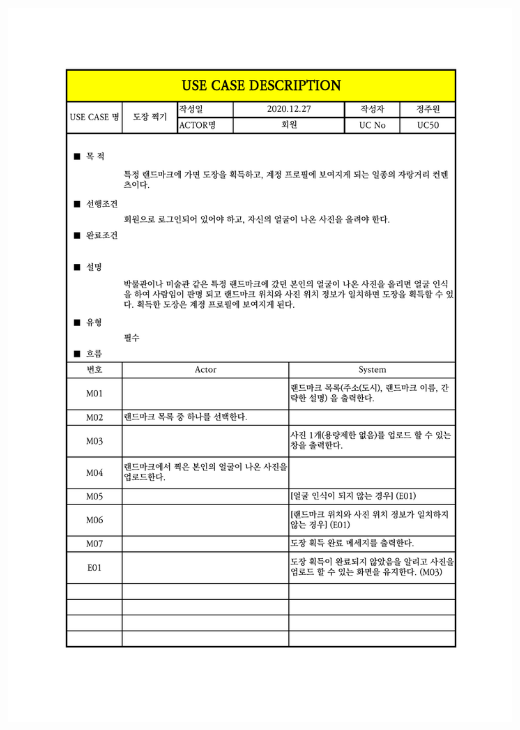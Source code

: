 {{{{{{{{{{{{{{{{{{{{{{{{{{{{{{{{{{{{{{{{{{{{{{{{{{{{{\includegraphics[width=1.1\textwidth]{./Figure/Design/Display/usecase/050.pdf} \\
}}}}}}}}}}}}}}}}}}}}}}}}}}}}}}}}}}}}}}}}}}}}}}}}}}}}}
